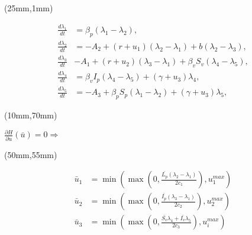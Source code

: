 
\begin{frame}[plain]
	{	
		\begin{textblock*}{80mm}(25mm,1mm)
			\begin{greenbox}{}
				\begin{align*}
				\frac{d\lambda_1}{dt} &=\beta_p (\lambda_1-\lambda_2),\\
				\frac{d\lambda_2}{dt} &=-A_2+(r+u_1)(\lambda_2-\lambda_1)+b(\lambda_2-\lambda_3),\\
				\frac{d\lambda_3}{dt} &-A_1+(r+u_2)(\lambda_3-\lambda_1)+\beta_vS_v(\lambda_4-\lambda_5),\\
				\frac{d\lambda_4}{dt} &=\beta_v I_p(\lambda_4-\lambda_5)+(\gamma+u_3)\lambda_4,\\
				\frac{d\lambda_5}{dt} &=-A_3+\beta_p S_p(\lambda_1-\lambda_2)+(\gamma+u_3)\lambda_5,				
				\end{align*}
			\end{greenbox}	
		\end{textblock*}
	}
	{
		\begin{textblock*}{32mm}(10mm,70mm)
			\begin{yellowbox}{}
				$\frac{\partial H}{\partial u}(\bar{u})=0 \Rightarrow$
			\end{yellowbox}
		\end{textblock*}
	}
	{
	\begin{textblock*}{70mm}(50mm,55mm)
		\begin{yellowbox}{}
			\begin{align*}
				\bar{u}_1&=\min\left(\max\left(0,\frac{\bar{L_p}(\lambda_2-\lambda_1)}{2c_1}\right),u_1^{max}\right)\\
				\bar{u}_2&=\min\left(\max\left(0,\frac{\bar{I_p}(\lambda_3-\lambda_1)}{2c_2}\right),u_2^{max}\right)\\
				\bar{u}_3&=\min\left(\max\left(0,\frac{\bar{S_v}\lambda_4+\bar{I_v}\lambda_5}{2c_3}\right),u^{max}_i\right)
			\end{align*}
		\end{yellowbox}
	\end{textblock*}
	}
\end{frame}
